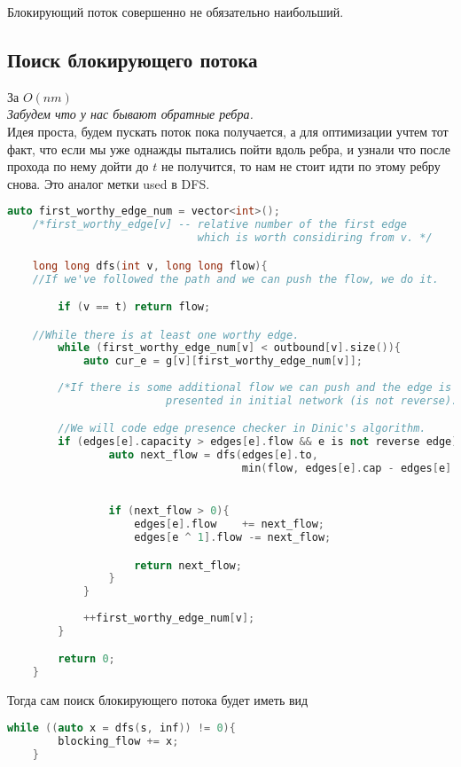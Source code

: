 \begin{note}
	Блокирующий поток совершенно не обязательно наибольший.	
\end{note}

\subsection{Поиск блокирующего потока}

За $O(nm)$ \\

\textit{Забудем что у нас бывают обратные ребра.} \\
Идея проста, будем пускать поток пока получается, а для оптимизации учтем тот факт, что если мы уже однажды пытались пойти вдоль ребра, и узнали что после прохода по нему дойти до $t$ не получится, то нам не стоит идти по этому ребру снова. Это аналог метки used в DFS.

\begin{lstlisting}[language = C++]
	auto first_worthy_edge_num = vector<int>(); 
	/*first_worthy_edge[v] -- relative number of the first edge 
							  which is worth considiring from v. */

	long long dfs(int v, long long flow){
	//If we've followed the path and we can push the flow, we do it.

		if (v == t) return flow;

	//While there is at least one worthy edge.
		while (first_worthy_edge_num[v] < outbound[v].size()){
			auto cur_e = g[v][first_worthy_edge_num[v]];
		
		/*If there is some additional flow we can push and the edge is 
						 presented in initial network (is not reverse). */

		//We will code edge presence checker in Dinic's algorithm.
		if (edges[e].capacity > edges[e].flow && e is not reverse edge){
				auto next_flow = dfs(edges[e].to, 
				                     min(flow, edges[e].cap - edges[e].flow));


				if (next_flow > 0){
					edges[e].flow	 += next_flow;
					edges[e ^ 1].flow -= next_flow;

					return next_flow;
				}
			}
		
			++first_worthy_edge_num[v];
		}

		return 0;
	}
\end{lstlisting}

Тогда сам поиск блокирующего потока будет иметь вид
\begin{lstlisting}[language = C++]
	while ((auto x = dfs(s, inf)) != 0){
		blocking_flow += x;
	}
\end{lstlisting}

